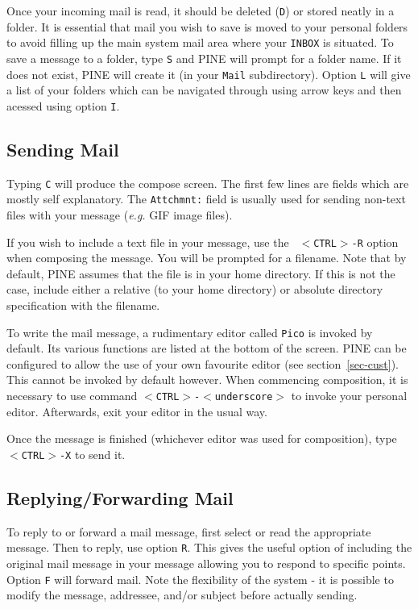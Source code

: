 Once your incoming mail is read, it should be deleted ({\tt D}) or
stored neatly in a folder. It is essential that mail you wish to save
is moved to your personal folders to avoid filling up the main system
mail area where your {\tt INBOX} is situated.  To save a message to a
folder, type {\tt S} and PINE will prompt for a folder name. If it does
not exist, PINE will create it (in your {\tt Mail} subdirectory).
Option {\tt L} will give a list of your folders which can be navigated
through using arrow keys and then acessed using option {\tt I}.

\subsection{Sending Mail}

Typing {\tt C} will produce the compose screen. The first few lines are
fields which are mostly self explanatory. The {\tt Attchmnt:} field is
usually used for sending non-text files with your message ({\em e.g.}
GIF image files).

If you wish to include a text file in your message, use the {\tt
$<$CTRL$>$-R} option when composing the message. You will be prompted
for a filename.  Note that by default, PINE assumes that the file is in
your home directory. If this is not the case, include either a relative
(to your home directory) or absolute directory specification with the
filename.

To write the mail message, a rudimentary editor called {\tt Pico} is
invoked by default.  Its various functions are listed at the bottom of
the screen.  PINE can be configured to allow the use of your own
favourite editor (see section~\ref{sec-cust}). This cannot be invoked
by default however.  When commencing composition, it is necessary to
use command {\tt $<$CTRL$>$-$<$underscore$>$} to invoke your personal
editor.  Afterwards, exit your editor in the usual way.

Once the message is finished (whichever editor was used for composition), 
type  {\tt $<$CTRL$>$-X} to send it.

\subsection{Replying/Forwarding Mail}

To reply to or forward a mail message, first select or read the
appropriate message. Then to reply, use option {\tt R}.  This gives the
useful option of including the original mail message in your message
allowing you to respond to specific points. Option {\tt F} will forward
mail. Note the flexibility of the system - it is possible to modify the
message, addressee, and/or subject before actually sending.

